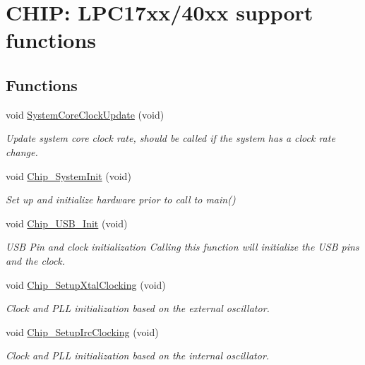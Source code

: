 \hypertarget{group___s_u_p_p_o_r_t__17_x_x__40_x_x___f_u_n_c}{\section{C\+H\+I\+P\+: L\+P\+C17xx/40xx support functions}
\label{group___s_u_p_p_o_r_t__17_x_x__40_x_x___f_u_n_c}
}
\subsection*{Functions}
\begin{DoxyCompactItemize}
\item 
void \hyperlink{group___s_u_p_p_o_r_t__17_x_x__40_x_x___f_u_n_c_gae0c36a9591fe6e9c45ecb21a794f0f0f}{System\+Core\+Clock\+Update} (void)
\begin{DoxyCompactList}\small\item\em Update system core clock rate, should be called if the system has a clock rate change. \end{DoxyCompactList}\item 
void \hyperlink{group___s_u_p_p_o_r_t__17_x_x__40_x_x___f_u_n_c_ga3450fa020f6b569cc2deb69c11e11b7c}{Chip\+\_\+\+System\+Init} (void)
\begin{DoxyCompactList}\small\item\em Set up and initialize hardware prior to call to main() \end{DoxyCompactList}\item 
void \hyperlink{group___s_u_p_p_o_r_t__17_x_x__40_x_x___f_u_n_c_gaa098023402e8e6034f34663ce39d9ccd}{Chip\+\_\+\+U\+S\+B\+\_\+\+Init} (void)
\begin{DoxyCompactList}\small\item\em U\+S\+B Pin and clock initialization Calling this function will initialize the U\+S\+B pins and the clock. \end{DoxyCompactList}\item 
void \hyperlink{group___s_u_p_p_o_r_t__17_x_x__40_x_x___f_u_n_c_ga18737e4a022570724c77c5cdea9c0258}{Chip\+\_\+\+Setup\+Xtal\+Clocking} (void)
\begin{DoxyCompactList}\small\item\em Clock and P\+L\+L initialization based on the external oscillator. \end{DoxyCompactList}\item 
void \hyperlink{group___s_u_p_p_o_r_t__17_x_x__40_x_x___f_u_n_c_ga6eff97a8da15798119eada6c5f000404}{Chip\+\_\+\+Setup\+Irc\+Clocking} (void)
\begin{DoxyCompactList}\small\item\em Clock and P\+L\+L initialization based on the internal oscillator. \end{DoxyCompactList}\end{DoxyCompactItemize}
